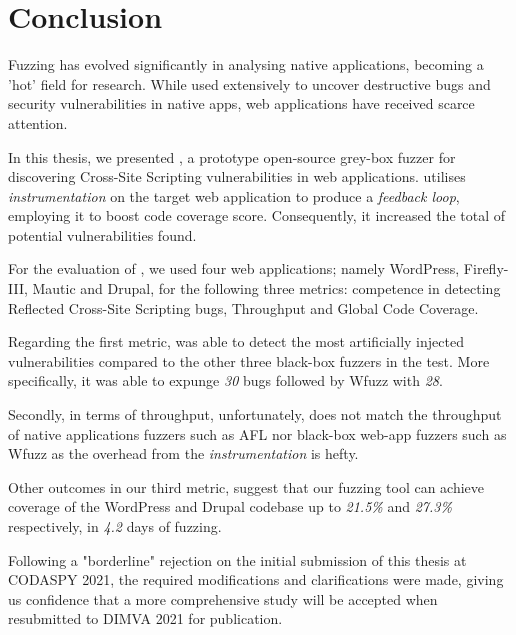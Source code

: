 \chapter{Conclusion}
\label{sec:conclusion}
\vspace*{0.25cm}

Fuzzing has evolved significantly in analysing native applications, becoming a 'hot' field for research. While used extensively to uncover destructive bugs and security vulnerabilities in native apps, web applications have received scarce attention.

In this thesis, we presented \pname{}, a prototype open-source grey-box fuzzer for discovering Cross-Site Scripting vulnerabilities in web applications. \pname{} utilises \emph{instrumentation} on the target web application to produce a \emph{feedback loop}, employing it to boost code coverage score.
Consequently, it increased the total of potential vulnerabilities found.

For the evaluation of \pname{}, we used four web applications; namely WordPress, Firefly-III, Mautic and Drupal, for the following three metrics: competence in detecting Reflected Cross-Site Scripting bugs, Throughput and Global Code Coverage.

Regarding the first metric, \pname{} was able to detect the most artificially injected vulnerabilities compared to the other three black-box fuzzers in the test. More specifically, it was able to expunge \emph{30} bugs followed by Wfuzz with \emph{28}. 

Secondly, in terms of throughput, unfortunately, \pname{} does not match the throughput of native applications fuzzers such as AFL nor black-box web-app fuzzers such as Wfuzz as the overhead from the \emph{instrumentation} is hefty. 

Other outcomes in our third metric, suggest that our fuzzing tool can achieve coverage of the WordPress and Drupal codebase up to \emph{21.5\%} and \emph{27.3\%} respectively, in \emph{4.2} days of fuzzing.

Following a "borderline" rejection on the initial submission of this thesis at CODASPY 2021, the required modifications and clarifications were made, giving us confidence that a more comprehensive study will be accepted when resubmitted to DIMVA 2021 for publication.